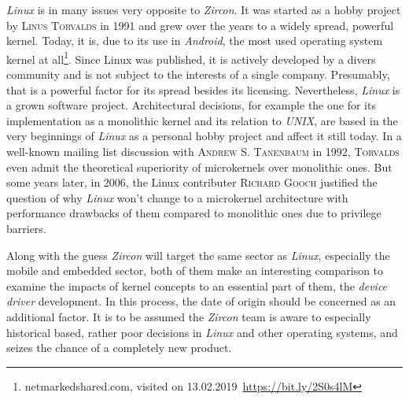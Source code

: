 \textit{Linux} is in many issues very opposite to \textit{Zircon}.
It was started as a hobby project by \textsc{Linus Torvalds} in 1991 and grew over the years to a widely spread, powerful kernel.
Today, it is, due to its use in \textit{Android}, the most used operating system kernel at all\footnote{netmarkedshared.com, visited on 13.02.2019~\url{https://bit.ly/2S0s4lM}}. 
Since Linux was published, it is actively developed by a divers community and is not subject to the interests of a single company. 
Presumably, that is a powerful factor for its spread besides its licensing.
Nevertheless, \textit{Linux} is a grown software project.
Architectural decisions, for example the one for its implementation as a monolithic kernel and its relation to \textit{UNIX}, are based in the very beginnings of \textit{Linux} as a personal hobby project and affect it still today.
In a well-known mailing list discussion with \textsc{Andrew S. Tanenbaum} in 1992, \textsc{Torvalds} even admit the theoretical superiority of microkernels over monolithic ones\cite{linux-is-obsolete}.
But some years later, in 2006, the Linux contributer \textsc{Richard Gooch} justified the question of why \textit{Linux} won't change to a microkernel architecture with performance drawbacks of them compared to monolithic ones due to privilege barriers\cite{why-linux-monolith}.

Along with the guess \textit{Zircon} will target the same sector as \textit{Linux}, especially the mobile and embedded sector, both of them make an interesting comparison to examine the impacts of kernel concepts to an essential part of them, the \textit{device driver} development.
In this process, the date of origin should be concerned as an additional factor.
It is to be assumed the \textit{Zircon} team is aware to especially historical based, rather poor decisions in \textit{Linux} and other operating systems, and seizes the chance of a completely new product.




